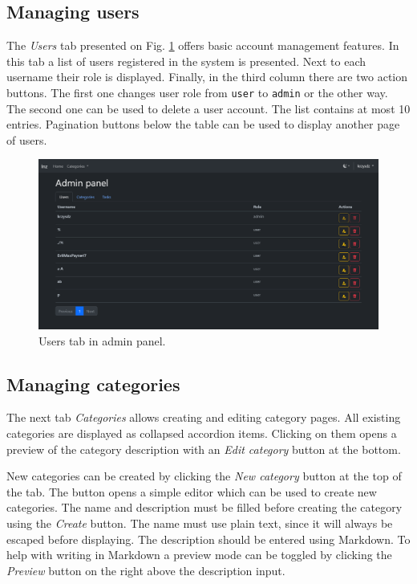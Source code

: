 \subsection{Managing users}

The \textit{Users} tab presented on Fig. \ref{fig:manual-admin-users} offers basic account management features. In this tab a list of users registered in the system is presented. Next to each username their role is displayed. Finally, in the third column there are two action buttons. The first one changes user role from \texttt{user} to \texttt{admin} or the other way. The second one can be used to delete a user account. The list contains at most 10 entries. Pagination buttons below the table can be used to display another page of users.

\begin{figure}
    \centering
    \includegraphics[width=\textwidth]{img/manual-admin-users.png}
    \caption{Users tab in admin panel.}
    \label{fig:manual-admin-users}
\end{figure}

\subsection{Managing categories}
\label{ssec:managing-categories}

The next tab \textit{Categories} allows creating and editing category pages. All existing categories are displayed as collapsed accordion items. Clicking on them opens a preview of the category description with an \textit{Edit category} button at the bottom.


New categories can be created by clicking the \textit{New category} button at the top of the tab. The button opens a simple editor which can be used to create new categories. The name and description must be filled before creating the category using the \textit{Create} button. The name must use plain text, since it will always be escaped before displaying. The description should be entered using Markdown. To help with writing in Markdown a preview mode can be toggled by clicking the \textit{Preview} button on the right above the description input.

